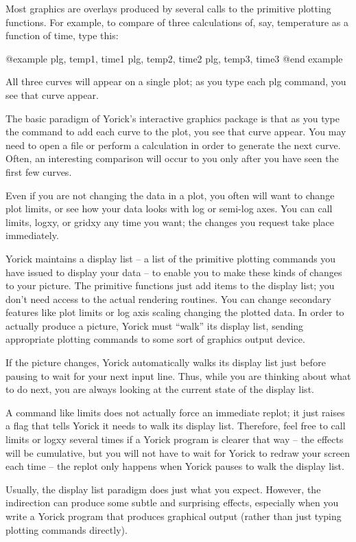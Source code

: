 Most graphics are overlays produced by several calls to the primitive
plotting functions.  For example, to compare of three calculations of,
say, temperature as a function of time, type this:

@example
plg, temp1, time1
plg, temp2, time2
plg, temp3, time3
@end example

All three curves will appear on a single plot; as you type each plg
command, you see that curve appear.

The basic paradigm of Yorick's interactive graphics package is that as
you type the command to add each curve to the plot, you see that curve
appear.  You may need to open a file or perform a calculation in order
to generate the next curve.  Often, an interesting comparison will
occur to you only after you have seen the first few curves.

Even if you are not changing the data in a plot, you often will want
to change plot limits, or see how your data looks with log or semi-log
axes.  You can call limits, logxy, or gridxy any time you want; the
changes you request take place immediately.

Yorick maintains a display list -- a list of the primitive plotting
commands you have issued to display your data -- to enable you to make
these kinds of changes to your picture.  The primitive functions just
add items to the display list; you don't need access to the actual
rendering routines.  You can change secondary features like plot
limits or log axis scaling changing the plotted data.  In order to
actually produce a picture, Yorick must ``walk'' its display list,
sending appropriate plotting commands to some sort of graphics output
device.

If the picture changes, Yorick automatically walks its display list
just before pausing to wait for your next input line.  Thus, while you
are thinking about what to do next, you are always looking at the
current state of the display list.

A command like limits does not actually force an immediate replot; it
just raises a flag that tells Yorick it needs to walk its display
list.  Therefore, feel free to call limits or logxy several times if a
Yorick program is clearer that way -- the effects will be cumulative,
but you will not have to wait for Yorick to redraw your screen each
time -- the replot only happens when Yorick pauses to walk the display
list.

Usually, the display list paradigm does just what you expect.
However, the indirection can produce some subtle and surprising
effects, especially when you write a Yorick program that produces
graphical output (rather than just typing plotting commands directly).

